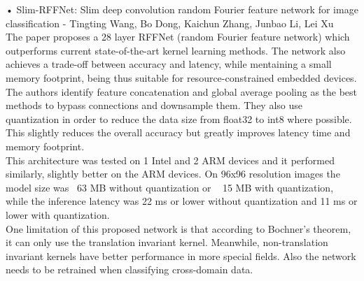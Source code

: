 \documentclass[11pt, a4paper, oneside, pdftex]{research_paper}
\begin{document}
\hspace{20mm}•\hspace{3mm}	Slim-RFFNet: Slim deep convolution random Fourier feature network for image classification - Tingting Wang, Bo Dong, Kaichun Zhang, Junbao Li, Lei Xu \\
\null \hspace{30mm}	The paper proposes a 28 layer RFFNet (random Fourier feature network) which outperforms current state-of-the-art kernel learning methods. The network also achieves a trade-off between accuracy and latency, while mentaining a small memory footprint, being thus suitable for resource-constrained embedded devices. \\
\null \hspace{30mm}	The authors identify feature concatenation and global average pooling as the best methods to bypass connections and downsample them. They also use quantization in order to reduce the data size from float32 to int8 where possible. This slightly reduces the overall accuracy but greatly improves latency time and memory footprint. \\
\null \hspace{30mm}	This architecture was tested on 1 Intel and 2 ARM devices and it performed similarly, slightly better on the ARM devices. On 96x96 resolution images the model size was ~63 MB without quantization or ~ 15 MB with quantization, while the inference latency was 22 ms or lower without quantization and 11 ms or lower with quantization. \\
\null \hspace{30mm}	One limitation of this proposed network is that according to Bochner’s theorem, it can only use the translation invariant kernel. Meanwhile, non-translation invariant kernels have better performance in more special fields. Also the network needs to be retrained when classifying cross-domain data. \\
\end{document}
